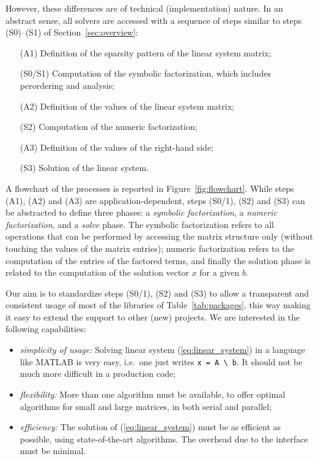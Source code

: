 \documentclass[acmtocl]{acmtrans2m}
\begin{document}
However, these differences are of technical (implementation) nature. In
an abstract sense, all solvers are accessed with a sequence of
steps similar to steps (S0)--(S1) of Section~\ref{sec:overview}:
\begin{enumerate}
\item[(A1)] Definition of the sparsity pattern of the linear system matrix;
\item[(S0/S1)] Computation of the symbolic factorization, which includes
perordering and analysis;
\item[(A2)] Definition of the values of the linear system matrix;
\item[(S2)] Computation of the numeric factorization;
\item[(A3)] Definition of the values of the right-hand side;
\item[(S3)] Solution of the linear system.
\end{enumerate}
A flowchart of the processes is reported in Figure~\ref{fig:flowchart}.
While steps (A1), (A2) and (A3) are application-dependent, steps (S0/1), (S2) and
(S3) can be abstracted to define three phases: a {\sl symbolic
factorization}, a {\sl numeric factorization}, and a {\sl solve} phase. The
symbolic factorization refers to all operations that can be performed by
accessing the matrix structure only (without touching the values of the matrix entries);
numeric factorization refers to the computation of the entries of the
factored terms, and
finally the solution phase is related to the computation of the solution vector
$x$ for a given $b$.

Our aim is to standardize steps (S0/1), (S2)
and (S3) to allow a transparent and consistent usage
of most of the libraries of Table~\ref{tab:packages}, this way making it easy
to extend the support to other (new) projects. We are interested in the
following capabilities:
\begin{itemize}

\item {\sl simplicity of usage:} Solving linear system (\ref{eq:linear_system}) in a language
like MATLAB is very easy, i.e.~one just writes \verb!x = A \ b!. It should not be much
more difficult in a production code;

\item {\sl flexibility:} More than one algorithm must be available,
  to offer optimal algorithms for small and large matrices, in both serial and
  parallel;

\item {\sl efficiency:} The solution of (\ref{eq:linear_system}) must be as
efficient as possible, using state-of-the-art algorithms. The
overhead due to the interface must be minimal.
\end{itemize}
\end{document}
